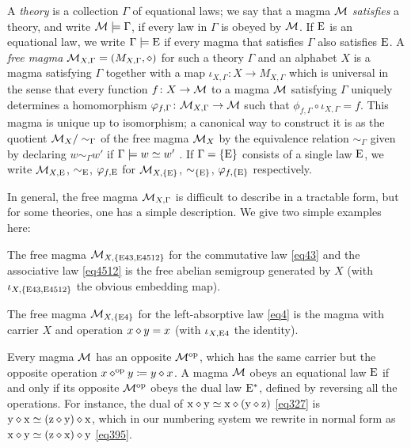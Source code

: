 A \emph{theory} is a collection $\Gamma$ of equational laws; we say that a magma ${\mathcal{M}}$ \emph{satisfies} a theory, and write ${\mathcal{M}} \models \Gamma$, if every law in $\Gamma$ is obeyed by ${\mathcal{M}}$.  If $\mathrm{E}$ is an equational law, we write $\Gamma \models \mathrm{E}$ if every magma that satisfies $\Gamma$ also satisfies $\mathrm{E}$. A \emph{free magma} ${\mathcal{M}}_{X,\Gamma} = (M_{X,\Gamma},\diamond)$ for such a theory $\Gamma$ and an alphabet $X$ is a magma satisfying $\Gamma$ together with a map $\iota_{X,\Gamma} \colon X \to M_{X,\Gamma}$ which is universal in the sense that every function $f \colon X \to {\mathcal{M}}$ to a magma ${\mathcal{M}}$ satisfying $\Gamma$ uniquely determines a homomorphism $\varphi_{f,\Gamma} \colon {\mathcal{M}}_{X,\Gamma} \to {\mathcal{M}}$ such that $\phi_{f,\Gamma} \circ \iota_{X,\Gamma} = f$.  This magma is unique up to isomorphism; a canonical way to construct it is as the quotient ${\mathcal{M}}_X/\sim_\Gamma$ of the free magma ${\mathcal{M}}_X$ by the equivalence relation $\sim_\Gamma$ given by declaring $w \sim_\Gamma w'$ if $\Gamma \models w \simeq w'$ \cite[Theorem 3.5.6]{term-rewriting}.  If $\Gamma = \{\mathrm{E}\}$ consists of a single law $\mathrm{E}$, we write ${\mathcal{M}}_{X,\mathrm{E}}$, $\sim_{\mathrm{E}}$, $\varphi_{f,\mathrm{E}}$ for ${\mathcal{M}}_{X,\{\mathrm{E}\}}$, $\sim_{\{\mathrm{E}\}}$, $\varphi_{f,\{\mathrm{E}\}}$ respectively.

In general, the free magma ${\mathcal{M}}_{X,\Gamma}$ is difficult to describe in a tractable form, but for some theories, one has a simple description.  We give two simple examples here:

\begin{example}\label{semi-group} The free magma ${\mathcal{M}}_{X,\{\mathrm{E}43, \mathrm{E}4512\}}$ for the commutative law \eqref{eq43} and the associative law \eqref{eq4512} is the free abelian semigroup generated by $X$ (with $\iota_{X,\{\mathrm{E}43,\mathrm{E}4512\}}$ the obvious embedding map).
\end{example}

\begin{example}\label{left-absorb}
The free magma ${\mathcal{M}}_{X,\{\mathrm{E}4\}}$ for the left-absorptive law \eqref{eq4} is the magma with carrier $X$ and operation $x \diamond y = x$ (with $\iota_{X,\mathrm{E}4}$ the identity).
\end{example}


Every magma ${\mathcal{M}}$ has an opposite ${\mathcal{M}}^{\mathrm{op}}$, which has the same carrier but the opposite operation $x \diamond^{\mathrm{op}} y \coloneqq y \diamond x$.  A magma ${\mathcal{M}}$ obeys an equational law $\mathrm{E}$ if and only if its opposite ${\mathcal{M}}^{\mathrm{op}}$ obeys the dual law $\mathrm{E}^*$, defined by reversing all the operations.  For instance, the dual of
$\mathrm{x} \diamond \mathrm{y} \simeq \mathrm{x} \diamond (\mathrm{y} \diamond \mathrm{z})$ \eqref{eq327} is $\mathrm{y} \diamond \mathrm{x} \simeq (\mathrm{z} \diamond \mathrm{y}) \diamond \mathrm{x}$, which in our numbering system we rewrite in normal form as $\mathrm{x} \diamond \mathrm{y} \simeq (\mathrm{z} \diamond \mathrm{x}) \diamond \mathrm{y}$ \eqref{eq395}.

